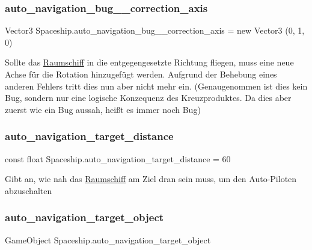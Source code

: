 \subsubsection{\texorpdfstring{auto\+\_\+navigation\+\_\+bug\+\_\+\_\+correction\+\_\+axis}{auto\_navigation\_bug\_180\_correction\_axis}}
{\footnotesize\ttfamily Vector3 Spaceship.\+auto\+\_\+navigation\+\_\+bug\+\_\+\_\+correction\+\_\+axis = new Vector3 (0, 1, 0)}



Sollte das \hyperlink{class_raumschiff}{Raumschiff} in die entgegengesetzte Richtung fliegen, muss eine neue Achse für die Rotation hinzugefügt werden. Aufgrund der Behebung eines anderen Fehlers tritt dies nun aber nicht mehr ein. (Genaugenommen ist dies kein Bug, sondern nur eine logische Konzequenz des Kreuzproduktes. Da dies aber zuerst wie ein Bug aussah, heißt es immer noch Bug) 

\mbox{\label{class_spaceship_a14d21edf96d6a77e14d975b506275e7e}} 
\subsubsection{\texorpdfstring{auto\+\_\+navigation\+\_\+target\+\_\+distance}{auto\_navigation\_target\_distance}}
{\footnotesize\ttfamily const float Spaceship.\+auto\+\_\+navigation\+\_\+target\+\_\+distance = 60}



Gibt an, wie nah das \hyperlink{class_raumschiff}{Raumschiff} am Ziel dran sein muss, um den Auto-\/\+Piloten abzuschalten 

\mbox{\label{class_spaceship_ad7b81478ac9e68d3b28d84ccda1b0e5f}} 
\subsubsection{\texorpdfstring{auto\+\_\+navigation\+\_\+target\+\_\+object}{auto\_navigation\_target\_object}}
{\footnotesize\ttfamily Game\+Object Spaceship.\+auto\+\_\+navigation\+\_\+target\+\_\+object}



